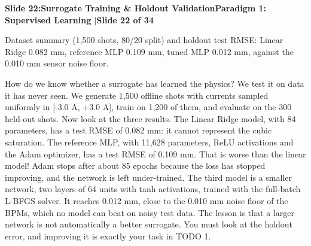 \documentclass[11pt,a4paper]{article}
\begin{document}
\clearpage
\hypertarget{slide.22}{}
{}
\noindent\begin{tcolorbox}[colback=navy,colframe=navy,left=6pt,right=6pt,top=3pt,bottom=3pt,boxrule=0pt,arc=2pt]
{\large\bfseries\color{white}Slide 22:\enspace Surrogate Training \& Holdout Validation}\hfill{\footnotesize\bfseries\color{white!85!lightbg}Paradigm 1: Supervised Learning \enspace$|$\enspace Slide 22 of 34}
\end{tcolorbox}
\vspace{0.2em}
\begin{tcolorbox}[colback=lightbg,colframe=bordergray,title={\footnotesize\bfseries\color{darkgray}Slide Visual Blueprint},fontupper=\small,left=6pt,right=6pt,top=2.5pt,bottom=2.5pt,boxrule=0.6pt,arc=2.5pt]
Dataset summary (1,500 shots, 80/20 split) and holdout test RMSE: Linear Ridge 0.082 mm, reference MLP 0.109 mm, tuned MLP 0.012 mm, against the 0.010 mm sensor noise floor.
\end{tcolorbox}
\vspace{0.2em}
\begin{tcolorbox}[colback=white,colframe=primaryblue,title={\footnotesize\bfseries\color{white}Spoken Presenter Script},fontupper=\small,left=6pt,right=6pt,top=3pt,bottom=3pt,boxrule=0.8pt,arc=2.5pt]
How do we know whether a surrogate has learned the physics? We test it on data it has never seen. We generate 1,500 offline shots with currents sampled uniformly in [-3.0 A, +3.0 A], train on 1,200 of them, and evaluate on the 300 held-out shots. Now look at the three results. The Linear Ridge model, with 84 parameters, has a test RMSE of 0.082 mm: it cannot represent the cubic saturation. The reference MLP, with 11,628 parameters, ReLU activations and the Adam optimizer, has a test RMSE of 0.109 mm. That is worse than the linear model! Adam stops after about 85 epochs because the loss has stopped improving, and the network is left under-trained. The third model is a smaller network, two layers of 64 units with tanh activations, trained with the full-batch L-BFGS solver. It reaches 0.012 mm, close to the 0.010 mm noise floor of the BPMs, which no model can beat on noisy test data. The lesson is that a larger network is not automatically a better surrogate. You must look at the holdout error, and improving it is exactly your task in TODO 1.
\end{tcolorbox}
\vspace{0.2em}
\end{document}
